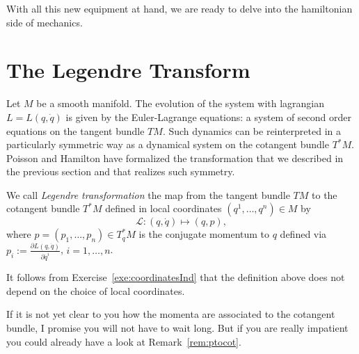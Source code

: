 \documentclass[english,fontsize=11pt,paper=b5]{scrbook}
\numberwithin{equation}{chapter}
\theoremstyle{definition}
\begin{document}
    With all this new equipment at hand, we are ready to delve into the hamiltonian side of mechanics.

    \section{The Legendre Transform}

    Let $M$ be a smooth manifold.
    The evolution of the system with lagrangian $L=L(q,\dot q)$ is given by the Euler-Lagrange equations: a system of second order equations on the tangent bundle $TM$.
    Such dynamics can be reinterpreted in a particularly symmetric way as a dynamical system on the cotangent bundle $T^*M$.
    Poisson and Hamilton have formalized the transformation that we described in the previous section and that realizes such symmetry.

    \begin{tcolorbox}
      We call \emph{Legendre transformation} the map from the tangent bundle $TM$ to the cotangent bundle $T^*M$ defined in local coordinates $(q^1, \ldots, q^n)\in M$ by
      \begin{equation}\label{eq:legrendreTrafo}
        \mathcal{L}: (q,\dot q) \mapsto (q,p),
      \end{equation}
      where $p = (p_1, \ldots, p_n) \in T^*_q M$ is the conjugate momentum to $q$ defined via $p_i := \frac{\partial L(q,\dot q)}{\partial \dot q^i}$, $i=1,\ldots,n$.
    \end{tcolorbox}
    It follows from Exercise~\ref{exe:coordinatesInd} that the definition above does not depend on the choice of local coordinates.


    If it is not yet clear to you how the momenta are associated to the cotangent bundle, I promise you will not have to wait long. But if you are really impatient you could already have a look at Remark~\ref{rem:ptocot}.
\end{document}
